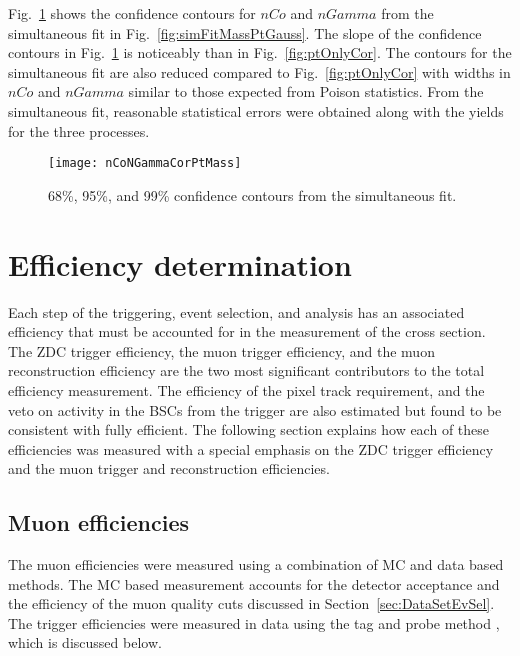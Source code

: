     Fig.~\ref{fig:simGaussCor} shows the confidence contours for $nCo$ and 
      $nGamma$ from the simultaneous fit in Fig.~\ref{fig:simFitMassPtGauss}.  
    The slope of the confidence contours in Fig.~\ref{fig:simGaussCor} 
      is noticeably than in Fig.~\ref{fig:ptOnlyCor}.
    The contours for the simultaneous fit are also reduced compared to 
      Fig.~\ref{fig:ptOnlyCor} with widths in $nCo$ and $nGamma$ similar to 
      those expected from Poison statistics. 
    From the simultaneous fit, reasonable statistical errors were obtained 
      along with the yields for the three processes. 

    \begin{figure}[!Hhbt]
      \centering
      \texttt{[image: nCoNGammaCorPtMass]}
      \caption{68\%, 95\%, and 99\% confidence contours from the 
        simultaneous fit. }
      \label{fig:simGaussCor}
    \end{figure}

  \section{\label{sec:effDet} Efficiency determination}
    Each step of the triggering, event selection, and analysis has an associated
      efficiency that must be accounted for in the  measurement of the \JPsi{} 
      cross section.  
    The ZDC trigger efficiency, the muon trigger efficiency, and the muon 
      reconstruction efficiency are the two most significant contributors to 
      the total efficiency measurement. 
    The efficiency of the pixel track requirement, and the veto on activity in 
      the BSCs from the trigger are also estimated but found to be consistent 
      with fully efficient. 
    The following section explains how each of these efficiencies was measured
      with a special emphasis on the ZDC trigger efficiency and the muon 
      trigger and reconstruction efficiencies. 

    \subsection{Muon efficiencies}
      The muon efficiencies were measured using a combination of MC and data 
        based methods.
      The MC based measurement accounts for the detector acceptance and the 
        efficiency of the muon quality cuts discussed in 
        Section~\ref{sec:DataSetEvSel}.
      The trigger efficiencies were measured in data using the tag and probe 
      method \cite{cmsTnP}, which is discussed below. 

